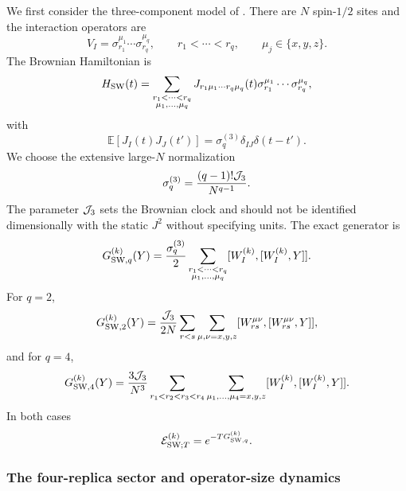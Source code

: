 \documentclass{article}
\theoremstyle{definition}
\begin{document}
We first consider the three-component model of \cite{swingle2024bosonic}.  There
are $N$ spin-$1/2$ sites and the interaction operators are
\begin{equation}
    V_I=\sigma_{r_1}^{\mu_1}\cdots\sigma_{r_q}^{\mu_q},
    \qquad
    r_1<\cdots<r_q,
    \qquad
    \mu_j\in\{x,y,z\}.
\end{equation}
The Brownian Hamiltonian is
\begin{equation}
    H_{\rm SW}(t)
    =\sum_{\substack{r_1<\cdots<r_q\\
                    \mu_1,\ldots,\mu_q}}
    J_{r_1\mu_1\cdots r_q\mu_q}(t)
    \sigma_{r_1}^{\mu_1}\cdots\sigma_{r_q}^{\mu_q},
\end{equation}
with
\begin{equation}
    \mathbb E[J_I(t)J_J(t')]
    =\sigma_q^{(3)}\delta_{IJ}\delta(t-t').
\end{equation}
We choose the extensive large-$N$ normalization
\begin{equation}
    \sigma_q^{(3)}
    =\frac{(q-1)!{\cal J}_3}{N^{q-1}}.
\end{equation}
The parameter ${\cal J}_3$ sets the Brownian clock and should not be
identified dimensionally with the static $J^2$ without specifying units.
The exact generator is
\begin{equation}
    G_{{\rm SW},q}^{(k)}(Y)
    =\frac{\sigma_q^{(3)}}{2}
    \sum_{\substack{r_1<\cdots<r_q\\
                    \mu_1,\ldots,\mu_q}}
    [W_I^{(k)},[W_I^{(k)},Y]].
\end{equation}
For $q=2$,
\begin{equation}
    G_{{\rm SW},2}^{(k)}(Y)
    =\frac{{\cal J}_3}{2N}
    \sum_{r<s}\sum_{\mu,\nu=x,y,z}
    [W_{rs}^{\mu\nu},[W_{rs}^{\mu\nu},Y]],
\end{equation}
and for $q=4$,
\begin{equation}
    G_{{\rm SW},4}^{(k)}(Y)
    =\frac{3{\cal J}_3}{N^3}
    \sum_{r_1<r_2<r_3<r_4}
    \sum_{\mu_1,\ldots,\mu_4=x,y,z}
    [W_I^{(k)},[W_I^{(k)},Y]].
\end{equation}
In both cases
\begin{equation}
    {\cal E}_{{\rm SW};T}^{(k)}
    =e^{-TG_{{\rm SW},q}^{(k)}}.
\end{equation}

\subsubsection{The four-replica sector and operator-size dynamics}
\end{document}
